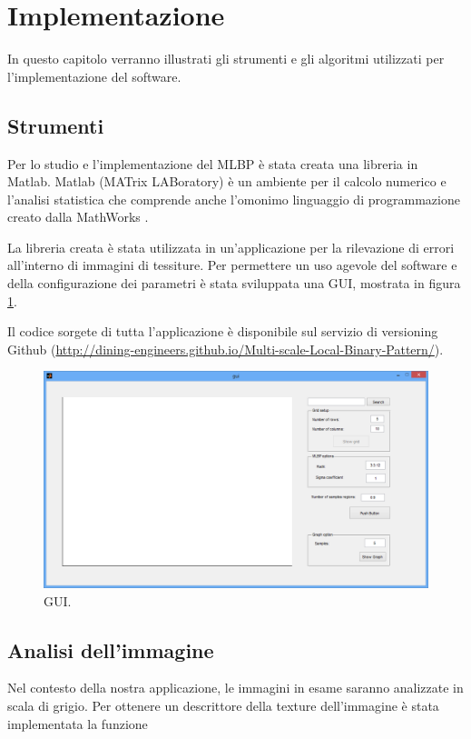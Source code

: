 \section{Implementazione}
In questo capitolo verranno illustrati gli strumenti e gli algoritmi utilizzati per l'implementazione del software.

\subsection{Strumenti}
Per lo studio e l'implementazione del \acf{MLBP} è stata creata una libreria in Matlab. 
Matlab (MATrix LABoratory) è un ambiente per il calcolo numerico e l'analisi statistica che comprende anche l'omonimo linguaggio di programmazione creato dalla MathWorks \cite{MATLAB:2013}.

La libreria creata è stata utilizzata in un'applicazione per la rilevazione di errori all'interno di immagini di tessiture.
Per permettere un uso agevole del software e della configurazione dei parametri è stata sviluppata una \acf{GUI}, mostrata in figura \ref{fig:GUI}.

Il codice sorgete di tutta l'applicazione è disponibile sul servizio di versioning Github (\href{http://dining-engineers.github.io/Multi-scale-Local-Binary-Pattern/}{http://dining-engineers.github.io/Multi-scale-Local-Binary-Pattern/}).\\

\begin{figure}[ht]
\begin{center}
\includegraphics[width=.95\textwidth]{img/gui}
\caption{GUI.}
\label{fig:GUI}
\end{center}
\end{figure}

\subsection{Analisi dell'immagine}
\label{imp:analisi}
Nel contesto della nostra applicazione, le immagini in esame saranno analizzate in scala di grigio.
Per ottenere un descrittore della texture dell'immagine è stata implementata la funzione

